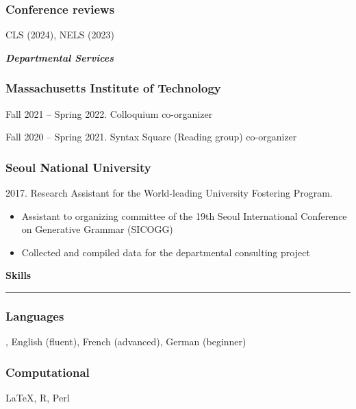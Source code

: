 \documentclass[10pt]{article}
\newcommand{\sect}[1]{\vspace{5mm} {\fontsize{14}{21}\selectfont \textbf{#1}} {\vspace{0.1cm}} \hrule {\vspace{0.3cm}}}
\newcommand{\subsect}[1]{\vspace{3mm} {\fontsize{11}{18}\selectfont \textit{\textbf{#1}}} {\vspace{0.3cm}}}
\begin{document}
\subsubsection*{Conference reviews}

CLS (2024), NELS (2023)

\vspace{\baselineskip}

\subsect{Departmental Services}

\vspace{-0.75cm}

\subsubsection*{Massachusetts Institute of Technology}
Fall 2021 -- Spring 2022. Colloquium co-organizer

Fall 2020 -- Spring 2021. Syntax Square (Reading group) co-organizer

\subsubsection*{Seoul National University}
{2017. Research Assistant for the World-leading University Fostering Program.

\begin{itemize}[leftmargin=15pt, topsep=0pt, itemsep=0pt, parsep=0pt]
	\item{{\small Assistant to organizing committee of the 19th Seoul International Conference on Generative Grammar (SICOGG)}}
	\item{{\small Collected and compiled data for the departmental consulting project}}
\end{itemize}
}

\sect{Skills}

\subsubsection*{Languages}
, English (fluent), French (advanced), German (beginner)
\subsubsection*{Computational}
 {\LaTeX}, R, Perl
\end{document}

